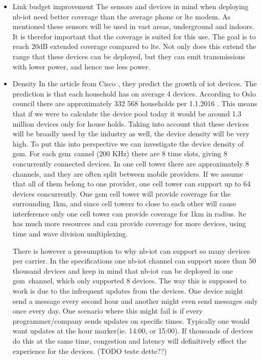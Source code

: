 \documentclass[USenglish]{ifimaster}  %
\begin{document}
\begin{itemize}
  \item Link budget improvement \newline
  The sensors and devices in mind when deploying \acrshort{nb-iot} need better coverage than the average phone or \acrshort{lte} modem. As mentioned these sensors will be used in vast areas, underground and indoors. It is therefor important that the coverage is suited for this use. The goal is to reach 20dB extended coverage compared to \acrshort{lte}. Not only does this extend the range that these devices can be deployed, but they can emit transmissions with lower power, and hence use less power.

  \item Density \newline
  In the article from Cisco \cite{online:IoT2020}, they predict the growth of \acrshort{iot} devices. The prediction is that each household has on average 4 devices. According to Oslo council there are approximately 332 568 households per 1.1.2016 \cite{online:husholdningstatistikk}. This means that if we were to calculate the device pool today it would be around 1.3 million devices only for house holds. Taking into account that these devices will be broadly used by the industry as well, the device density will be very high. To put this into perspective we can investigate the device density of \acrshort{gsm}. For each \acrshort{gsm} cannel (200 KHz) there are 8 time slots, giving 8 concurrently connected devices. In one cell tower there are approximately 8 channels, and they are often split between mobile providers. If we assume that all of them belong to one provider, one cell tower can support up to 64 devices concurrently. One \acrshort{gsm} cell tower will provide coverage for the surrounding 1km, and since cell towers to close to each other will cause interference only one cell tower can provide coverage for 1km in radius. \acrshort{lte} has much more resources and can provide coverage for more devices, using time and wave division multiplexing.

  There is however a presumption to why \acrshort{nb-iot} can support so many devices per carrier. In the specifications one \acrshort{nb-iot} channel can support more than 50 thousand devices and keep in mind that \acrshort{nb-iot} can be deployed in one \acrshort{gsm} channel, which only supported 8 devices. The way this is supposed to work is due to the infrequent updates from the devices. One device might send a message every second hour and another might even send messages only once every day. One scenario where this might fail is if every programmer/company sends updates on specific times. Typically one would want updates at the hour marker(ie. 14:00, or 15:00). If thousands of devices do this at the same time, congestion and latency will definitively effect the experience for the devices. (TODO teste dette??)


\end{itemize}
\end{document}
